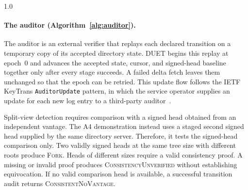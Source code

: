 \begin{spacing}{1.0}
{\begin{algorithm}[H]
{{{      
    }
  }
}
\end{algorithm}
}

\clearpage
\paragraph{The auditor (Algorithm~\ref{alg:auditor}).} The auditor is an external verifier that replays
each declared transition on a temporary copy of its accepted directory state. DUET begins this replay
at epoch~0 and advances the accepted state, cursor, and signed-head baseline together only after every
stage succeeds. A failed delta fetch leaves them unchanged so that the epoch can be retried. This
update flow follows the IETF KeyTrans \texttt{AuditorUpdate} pattern, in which the service operator
supplies an update for each new log entry to a third-party auditor~\cite[Section~15.2]{ietf-keytrans-protocol}.

Split-view detection requires comparison with a signed head obtained from an independent vantage.
The A4 demonstration instead uses a staged second signed head supplied by the same directory server.
Therefore, it tests the signed-head comparison only. Two validly signed heads at the same tree size
with different roots produce \textsc{Fork}. Heads of different sizes require a valid consistency proof.
A missing or invalid proof produces \textsc{ConsistencyUnverified} without establishing equivocation.
If no valid comparison head is available, a successful transition audit returns
\textsc{ConsistentNoVantage}.


\end{spacing}
